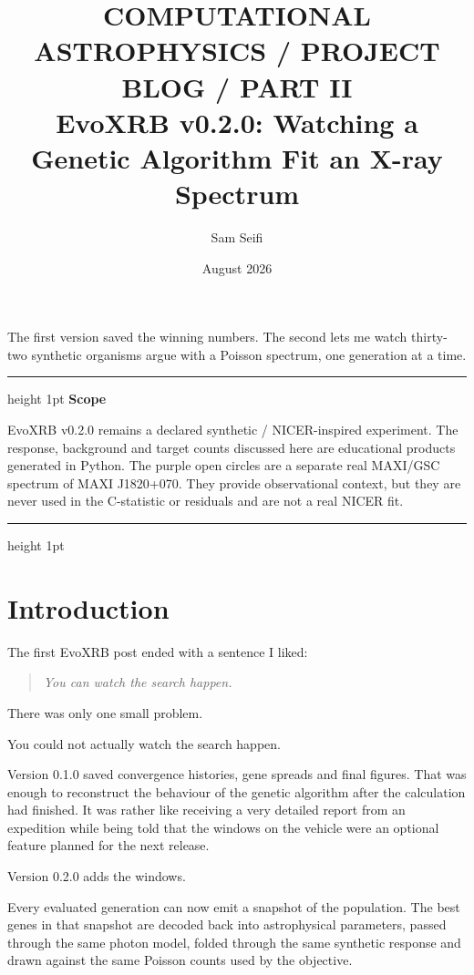 \documentclass[11pt]{article}
\title{\vspace{-1.6cm}
  {\small\color{EvoGreen}\MakeUppercase{Computational astrophysics / Project blog / Part II}}\\[0.8em]
  \textbf{EvoXRB v0.2.0: Watching a Genetic Algorithm Fit an X-ray Spectrum}
}
\author{Sam Seifi}
\date{August 2026}
\newenvironment{scopebox}[1][Scope]
{%
  \begin{center}
  \begin{minipage}{0.92\linewidth}
  \color{EvoDark}
  \hrule height 1pt
  \vspace{0.55em}
  \textbf{\textcolor{EvoGreen}{#1}}\par
  \small
}
{%
  \par\vspace{0.3em}
  \hrule height 1pt
  \end{minipage}
  \end{center}
}
\begin{document}
\maketitle

\begin{center}
\begin{minipage}{0.86\linewidth}
\large
The first version saved the winning numbers. The second lets me watch thirty-two
synthetic organisms argue with a Poisson spectrum, one generation at a time.
\end{minipage}
\end{center}

\begin{scopebox}
EvoXRB v0.2.0 remains a declared synthetic / NICER-inspired experiment. The
response, background and target counts discussed here are educational products
generated in Python. The purple open circles are a separate real MAXI/GSC
spectrum of MAXI J1820+070. They provide observational context, but they are
never used in the C-statistic or residuals and are not a real NICER fit.
\end{scopebox}

\section*{Introduction}

The first EvoXRB post ended with a sentence I liked:

\begin{quote}
\textit{You can watch the search happen.}
\end{quote}

There was only one small problem.

You could not actually watch the search happen.

Version 0.1.0 saved convergence histories, gene spreads and final figures. That
was enough to reconstruct the behaviour of the genetic algorithm after the
calculation had finished. It was rather like receiving a very detailed report
from an expedition while being told that the windows on the vehicle were an
optional feature planned for the next release.

Version 0.2.0 adds the windows.

Every evaluated generation can now emit a snapshot of the population. The best
genes in that snapshot are decoded back into astrophysical parameters, passed
through the same photon model, folded through the same synthetic response and
drawn against the same Poisson counts used by the objective.
\end{document}
